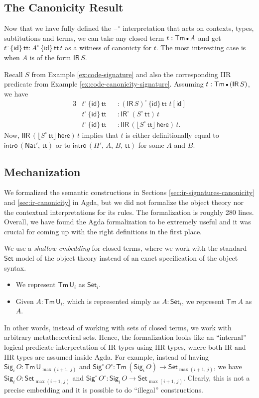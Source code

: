 \documentclass[acmsmall,screen,review,anonymous]{acmart}
\newcommand{\msf}[1]{{\mathsf{#1}}}
\newcommand{\U}{\msf{U}}
\newcommand{\Set}{\msf{Set}}
\newcommand{\Nat}{\msf{Nat}}
\newcommand{\Sig}{\msf{Sig}}
\newcommand{\ttt}{\msf{tt}}
\newcommand{\blank}{{\mathord{\hspace{1pt}\text{--}\hspace{1pt}}}}
\newcommand{\IR}{\msf{IR}}
\newcommand{\intro}{\msf{intro}}
\newcommand{\IIR}{\msf{IIR}}
\newcommand{\floord}[1]{\lfloor #1 \rfloor}
\newcommand{\emptycon}{\scaleobj{.75}\bullet}
\newcommand{\id}{\msf{id}}
\newcommand{\Tm}{\msf{Tm}}
\newcommand{\w}{\circ}
\newcommand{\here}{\msf{here}}
\begin{document}
\subsection{The Canonicity Result}

Now that we have fully defined the $\blank^\w$ interpretation that acts on contexts, types,
subtitutions and terms, we can take any closed term $t : \Tm\,\emptycon\,A$ and get
$t^\w\,\{\id\}\,\ttt : A^\w\,\{\id\}\,\ttt\,t$ as a witness of canonicty for $t$. The most
interesting case is when $A$ is of the form $\IR\,S$.
\begin{example}
Recall $S$ from Example \ref{ex:code-signature} and
also the corresponding IIR predicate from Example \ref{ex:code-canonicity-signature}. Assuming $t :
\Tm\,\emptycon\,(\IR\,S)$, we have
\begin{alignat*}{3}
  &t^\w\,\{\id\}\,\ttt &&: (\IR\,S)^\w\,\{\id\}\,\ttt\,\,t[\id]\\
  &t^\w\,\{\id\}\,\ttt &&: \IR^\w\,(S^\w\,\ttt)\,t\\
  &t^\w\,\{\id\}\,\ttt &&: \IIR\,(\floord{S^\w\,\ttt}\,\here)\,t.
\end{alignat*}
Now, $\IIR\,(\floord{S^\w\,\ttt}\,\here)\,t$ implies that $t$ is either definitionally equal to $\intro\,(\Nat',\,\ttt)$
or to $\intro\,(\Pi',\,A,\,B,\,\ttt)$ for some $A$ and $B$.
\end{example}

\subsection{Mechanization}\label{sec:canonicity-mechanization}

We formalized the semantic constructions in Sections \ref{sec:ir-signatures-canonicity} and
\ref{sec:ir-canonicity} in Agda, but we did not formalize the object theory nor the contextual
interpretations for its rules. The formalization is roughly 280 lines. Overall, we have found the
Agda formalization to be extremely useful and it was crucial for coming up with the right
definitions in the first place.

We use a \emph{shallow embedding} for closed terms, where we work with the standard $\Set$ model of
the object theory instead of an exact specification of the object syntax.
\begin{itemize}
\item We represent $\Tm\,\U_i$ as $\Set_i$.
\item Given $A : \Tm\,\U_i$, which is represented simply as $A : \Set_i$, we represent $\Tm\,A$ as $A$.
\end{itemize}
In other words, instead of working with sets of closed terms, we work with arbitrary metatheoretical
sets. Hence, the formalization looks like an ``internal'' logical predicate interpretation of IR
types using IIR types, where both IR and IIR types are assumed inside Agda. For example, instead of
having $\Sig_i\,O : \Tm\,\U_{\max(i+1,\,j)}$ and $\Sig^\w\,O^\w : \Tm\,(\Sig_i\,O) \to
\Set_{\max(i+1,\,j)}$, we have $\Sig_i\,O : \Set_{\max(i+1,\,j)}$ and $\Sig^\w\,O^\w : \Sig_i\,O \to
\Set_{\max(i+1,\,j)}$. Clearly, this is not a precise embedding and it is possible to do ``illegal''
constructions.
\end{document}
